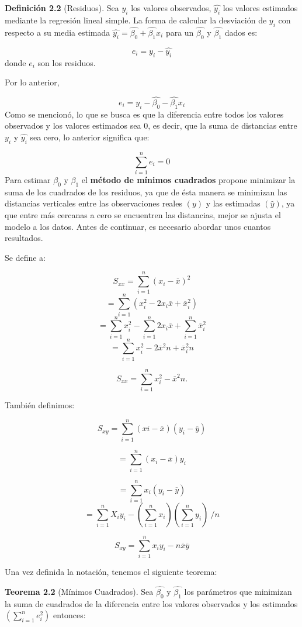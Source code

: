 \documentclass[a4paper,oneside,openany]{book}
\begin{document}
\textbf{Definición 2.2} (Residuos). Sea \(y_{i}\) los valores
observados, \(\hat{y_{i}}\) los valores estimados mediante la regresión
lineal simple. La forma de calcular la desviación de \(y_{i}\) con
respecto a su media estimada
\(\hat{y_{i}}=\hat{\beta_{0}}+\hat{\beta_{1}}x_{i}\) para un
\(\hat{\beta_{0}}\) y \(\hat{\beta_{1}}\) dados es:

\[e_{i}=y_{i}-\hat{y_{i}}\] donde \(e_{i}\) son los residuos.

Por lo anterior,

\[e_{i}=y_{i}-\hat{\beta_{0}}-\hat{\beta_{1}}x_{i}\] Como se mencionó,
lo que se busca es que la diferencia entre todos los valores observados
y los valores estimados sea 0, es decir, que la suma de distancias entre
\(y_{i}\) y \(\hat{y_{i}}\) sea cero, lo anterior significa que:

\[\sum_{i=1}^{n}e_{i}=0\] Para estimar \(\beta_{0}\) y \(\beta_{1}\) el
\textbf{método de mínimos cuadrados} propone minimizar la suma de los
cuadrados de los residuos, ya que de ésta manera se minimizan las
distancias verticales entre las observaciones reales \((y)\) y las
estimadas \((\hat{y})\), ya que entre más cercanas a cero se encuentren
las distancias, mejor se ajusta el modelo a los datos. Antes de
continuar, es necesario abordar unos cuantos resultados.

Se define a:

\[S_{xx}=\sum_{i=1}^{n}(x_{i}-\overline{x})^{2}\]
\[=\sum_{i=1}^{n}(x_{i}^2-2x_{i}\overline{x}+\overline{x}_{i}^{2})\]
\[=\sum_{i=1}^{n}x_{i}^{2}-\sum_{i=1}^{n}2x_{i}\overline{x}+\sum_{i=1}^{n}\overline{x}_{i}^2\]
\[=\sum_{i=1}^{n}x_{i}^2-2\overline{x}^2n+\overline{x}_{i}^2n\]

\[S_{xx}=\sum_{i=1}^{n}x_{i}^2-\overline{x}^2n.\]

También definimos:

\[S_{xy}=\sum_{i=1}^{n}(xi-\overline{x})(y_{i}-\overline{y})\]

\[=\sum_{i=1}^{n}(x_{i}-\overline{x})y_{i}\]

\[=\sum_{i=1}^{n}x_{i}(y_{i}-\overline{y})\]
\[=\sum_{i=1}^{n}X_{i}y_{i}-\left(\sum_{i=1}^{n}x_{i}\right) \left(\sum_{i=1}^{n}y_{i}\right) \ /{n}\]

\[S_{xy}=\sum_{i=1}^{n}x_{i}y_{i}-n\overline{x}\overline{y}\]

Una vez definida la notación, tenemos el siguiente teorema:

\textbf{Teorema 2.2} (Mínimos Cuadrados). Sea \(\hat{\beta_0}\) y
\(\hat{\beta_{1}}\) los parámetros que minimizan la suma de cuadrados de
la diferencia entre los valores observados y los estimados
\(\left(\sum_{i=1}^{n}e_i^2\right)\) entonces:
\end{document}

